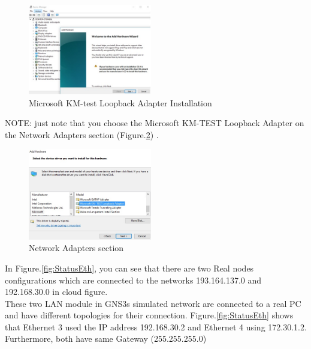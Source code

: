 \documentclass{article}
\begin{document}
\begin{figure}[H]
	\centering
		\includegraphics[width=0.48\textwidth]{LoopBackIns1.jpg}
	
	\caption{\small Microsoft KM-test Loopback Adapter Installation\newline}
	\label{fig:KMINS}
\end{figure}


NOTE: just note that you choose the Microsoft KM-TEST Loopback Adapter on the Network Adapters section (Figure.\ref{fig:KMINS2}) .


\begin{figure}[H]
	\begin{center}
		\includegraphics[width=0.48\textwidth]{LoopBackIns2.jpg}
	\end{center}
	\caption{\small Network Adapters section \newline}
	\label{fig:KMINS2}
\end{figure}


In Figure.\ref{fig:StatusEth}, you can see that there are two Real nodes configurations which are connected to the networks 193.164.137.0 and 192.168.30.0 in cloud figure.\\


These two LAN module in GNS3s simulated network are connected to a real PC and have different topologies for their connection. Figure.\ref{fig:StatusEth} shows that Ethernet 3 used the IP address 192.168.30.2 and Ethernet 4 using 172.30.1.2. Furthermore, both have same Gateway (255.255.255.0)
\end{document}
